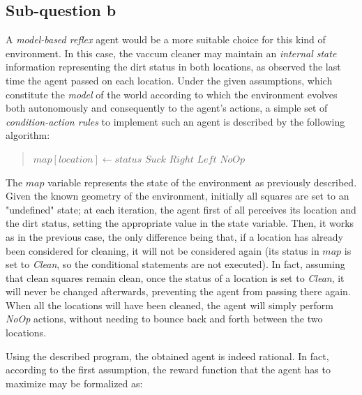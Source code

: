 \documentclass[letterpaper,headings=standardclasses]{scrartcl}
\begin{document}
\subsection{Sub-question b}

A \emph{model-based reflex} agent would be a more suitable choice for this kind of environment. In this case, the vaccum cleaner may maintain an \emph{internal state} information representing the dirt status in both locations, as observed the last time the agent passed on each location. Under the given assumptions, which constitute the \emph{model} of the world according to which the environment evolves both autonomously and consequently to the agent's actions, a simple set of \emph{condition-action rules} to implement such an agent is described by the following algorithm:

\begin{quote}
\begin{algorithmic}

  \State $map[location] \gets status$
   \Return $Suck$
   \Return $Right$
   \Return $Left$
  \Else{} \Return $NoOp$
  \EndIf
\EndFunction

\end{algorithmic}
\end{quote}

The $map$ variable represents the state of the environment as previously described. Given the known geometry of the environment, initially all squares are set to an "undefined" state; at each iteration, the agent first of all perceives its location and the dirt status, setting the appropriate value in the state variable. Then, it works as in the previous case, the only difference being that, if a location has already been considered for cleaning, it will not be considered again (its status in $map$ is set to \emph{Clean}, so the conditional statements are not executed). In fact, assuming that clean squares remain clean, once the status of a location is set to \emph{Clean}, it will never be changed afterwards, preventing the agent from passing there again. When all the locations will have been cleaned, the agent will simply perform \emph{NoOp} actions, without needing to bounce back and forth between the two locations.

Using the described program, the obtained agent is indeed rational. In fact, according to the first assumption, the reward function that the agent has to maximize may be formalized as:
\end{document}
